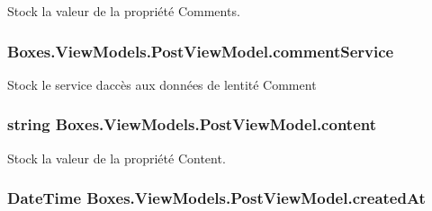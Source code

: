 Stock la valeur de la propriété {\ttfamily Comments}. 

\subsubsection[{\texorpdfstring{comment\+Service}{commentService}}]{ Boxes.\+View\+Models.\+Post\+View\+Model.\+comment\+Service\hspace{0.3cm}{\ttfamily [private]}}\hypertarget{class_boxes_1_1_view_models_1_1_post_view_model_acc5fcad092fad7381a4c3af8395a4603}{}\label{class_boxes_1_1_view_models_1_1_post_view_model_acc5fcad092fad7381a4c3af8395a4603}


Stock le service d\textquotesingle{}accès aux données de l\textquotesingle{}entité Comment 

\subsubsection[{\texorpdfstring{content}{content}}]{\setlength{\rightskip}{0pt plus 5cm}string Boxes.\+View\+Models.\+Post\+View\+Model.\+content\hspace{0.3cm}{\ttfamily [private]}}\hypertarget{class_boxes_1_1_view_models_1_1_post_view_model_a0482a2e9d39016182354f88d1eb1d115}{}\label{class_boxes_1_1_view_models_1_1_post_view_model_a0482a2e9d39016182354f88d1eb1d115}


Stock la valeur de la propriété {\ttfamily Content}. 

\subsubsection[{\texorpdfstring{created\+At}{createdAt}}]{\setlength{\rightskip}{0pt plus 5cm}Date\+Time Boxes.\+View\+Models.\+Post\+View\+Model.\+created\+At\hspace{0.3cm}{\ttfamily [private]}}\hypertarget{class_boxes_1_1_view_models_1_1_post_view_model_a4fe5c87ad1587445397b366715866491}{}\label{class_boxes_1_1_view_models_1_1_post_view_model_a4fe5c87ad1587445397b366715866491}


